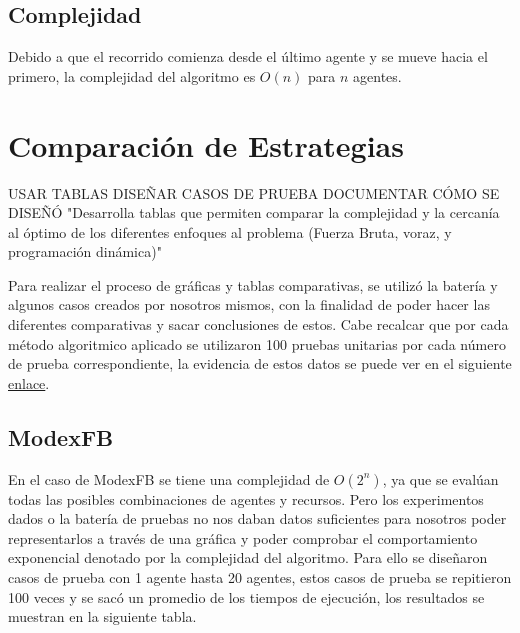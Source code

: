 \documentclass[letterpaper,10pt]{article}
\begin{document}
\subsection{Complejidad}
Debido a que el recorrido comienza desde el último agente y se mueve hacia el primero, la complejidad del algoritmo es $O(n)$ para $n$ agentes.
\label{subsec:complejidad_programacion_dinamica}
\section{Comparación de Estrategias}
\label{sec:comparacion_estrategias}
USAR TABLAS DISEÑAR CASOS DE PRUEBA DOCUMENTAR CÓMO SE DISEÑÓ
"Desarrolla tablas que permiten comparar la complejidad y la cercanía al óptimo de los diferentes enfoques al problema (Fuerza Bruta, voraz, y programación dinámica)"

Para realizar el proceso de gráficas y tablas comparativas, se utilizó la batería y algunos casos creados por nosotros mismos, con la finalidad de poder hacer las diferentes comparativas y sacar conclusiones de estos. Cabe recalcar que por cada método algoritmico aplicado se utilizaron 100 pruebas unitarias por cada número de prueba correspondiente, la evidencia de estos datos se puede ver en el siguiente \href{https://1drv.ms/x/s!Au19Z890RbcYgYp-EkAe5e8Z_uKeHA?e=RUO2BH}{enlace}.
\subsection{ModexFB}
En el caso de ModexFB se tiene una complejidad de \(O(2^n)\), ya que se evalúan todas las posibles combinaciones de agentes y recursos. Pero los experimentos dados o la batería de pruebas no nos daban datos suficientes para nosotros poder representarlos a través de una gráfica y poder comprobar el comportamiento exponencial denotado por la complejidad del algoritmo.
Para ello se diseñaron casos de prueba con 1 agente hasta 20 agentes, estos casos de prueba se repitieron 100 veces y se sacó un promedio de los tiempos de ejecución, los resultados se muestran en la siguiente tabla.
\end{document}
